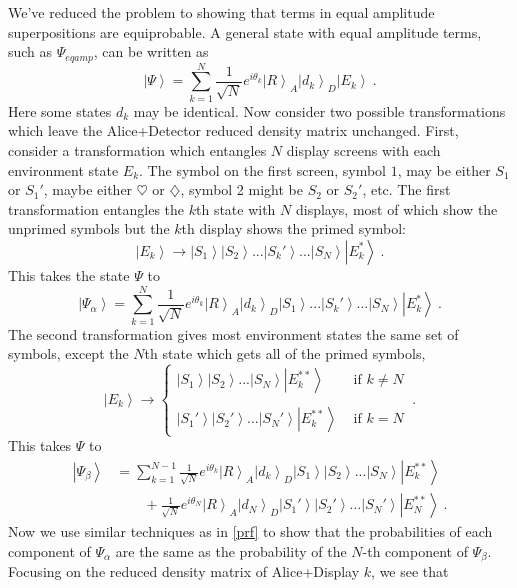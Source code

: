 \documentclass[onecolumn,secnumarabic,amsmath,amssymb,balancelastpage,nofootinbib]{article}
\newcommand{\ket}[1]{\ensuremath{\left|#1\right\rangle}}
\begin{document}
We've reduced the problem to showing that terms in equal amplitude superpositions are equiprobable.  A general state with equal amplitude terms, such as $\Psi_{eqamp}$, can be written as
\begin{equation}
\ket{\Psi}=\sum_{k=1}^N{\frac{1}{\sqrt{N}}e^{i\theta_k}\ket{R}_A\ket{d_k}_D\ket{E_k}}\ .
\label{psipsipsi}
\end{equation}
Here some states $d_k$ may be identical.  Now consider two possible transformations which leave the Alice+Detector reduced density matrix unchanged.  First, consider a transformation which entangles $N$ display screens with each environment state $E_k$.  The symbol on the first screen, symbol $1$, may be either $S_1$ or $S_1'$, maybe either $\heartsuit$ or $\diamondsuit$, symbol 2 might be $S_2$ or $S_2'$, etc.  The first transformation entangles the $k$th state with $N$ displays, most of which show the unprimed symbols but the $k$th display shows the primed symbol:
\begin{equation}
\ket{E_k}\longrightarrow\ket{S_1}\ket{S_2}...\ket{S_k'}...\ket{S_N}\ket{E_k^*}\ .
\label{}
\end{equation}
This takes the state $\Psi$ to
\begin{equation}
\ket{\Psi_\alpha}=\sum_{k=1}^N{\frac{1}{\sqrt{N}}e^{i\theta_k}\ket{R}_A\ket{d_k}_D\ket{S_1}...\ket{S_k'}...\ket{S_N}\ket{E_k^*}}\ .
\label{psialphaalpha}
\end{equation}
The second transformation gives most environment states the same set of symbols, except the $N$th state which gets all of the primed symbols,
\begin{equation}
\ket{E_k}\longrightarrow\left\{\begin{array}{ll} \ket{S_1}\ket{S_2}...\ket{S_N}\ket{E_k^{**}} & \text{   if }k\neq N \\\\ \ket{S_1'}\ket{S_2'}...\ket{S_N'}\ket{E_k^{**}} & \text{   if }k= N  \end{array}\right.\ .
\label{}
\end{equation}
This takes $\Psi$ to
\begin{align}
\ket{\Psi_\beta}&= \sum_{k=1}^{N-1}{\frac{1}{\sqrt{N}}e^{i\theta_k}\ket{R}_A\ket{d_k}_D\ket{S_1}\ket{S_2}...\ket{S_N}\ket{E_k^{**}}}
\nonumber
\\
&\qquad+ \frac{1}{\sqrt{N}}e^{i\theta_N}\ket{R}_A\ket{d_N}_D\ket{S_1'}\ket{S_2'}...\ket{S_N'}\ket{E_N^{**}}\ .
\label{}
\end{align}
Now we use similar techniques as in \textsection \ref{prf} to show that the probabilities of each component of $\Psi_\alpha$ are the same as the probability of the $N$-th component of $\Psi_\beta$.  Focusing on the reduced density matrix of Alice+Display $k$, we see that 
\end{document}
